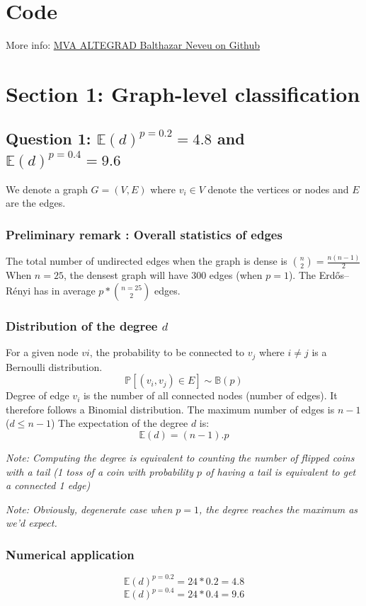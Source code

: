 \documentclass[a4paper]{article}
\begin{document}

\section*{Code}

More info:
\href{https://github.com/balthazarneveu/MVA23_ALTEGRAD/#readme}{MVA ALTEGRAD Balthazar Neveu on Github}

\section{Section 1: Graph-level classification}
\subsection*{Question 1: $\mathbb{E}(d)^{p=0.2} = 4.8$ and $\mathbb{E}(d)^{p=0.4} = 9.6$}
We denote a graph $G = (V, E)$ where $v_i \in V$ denote the vertices or nodes and $E$ are the edges.
\subsubsection*{Preliminary remark : Overall statistics of edges}

The total number of undirected edges when the graph is dense is ${n\choose 2} =\frac{n(n-1)}{2}$
When $n=25$, the densest graph will have 300 edges (when $p=1$).
The Erdős–Rényi has in average $p * {n=25 \choose 2}$ edges.

\subsubsection*{Distribution of the degree $d$}
For a given node $v{i}$, the probability to be connected to $v_j$ where $i \neq j$ is a
Bernoulli distribution.
$$\mathbb{P}[(v_{i},v_{j}) \in E] \sim \mathbb{B}(p)$$ 
Degree of edge $v_{i}$ is the number of all connected nodes (number of edges).
It therefore follows a Binomial distribution. 
The maximum number of edges is $n-1$ ($d \leq n-1$)
The expectation of the degree $d$ is:
$$\mathbb{E}(d) = (n-1).p$$

\textit{Note: Computing the degree is equivalent to counting the number of flipped coins with a tail (1 toss of a coin with probability $p$ of having a tail is equivalent 
to get a connected 1 edge)}

\textit{Note: Obviously, degenerate case when $p=1$, the degree reaches the maximum as we'd expect.}

\subsubsection*{Numerical application}
$$\mathbb{E}(d)^{p=0.2} = 24*0.2 = 4.8$$
$$\mathbb{E}(d)^{p=0.4} = 24*0.4 = 9.6$$
\end{document}
